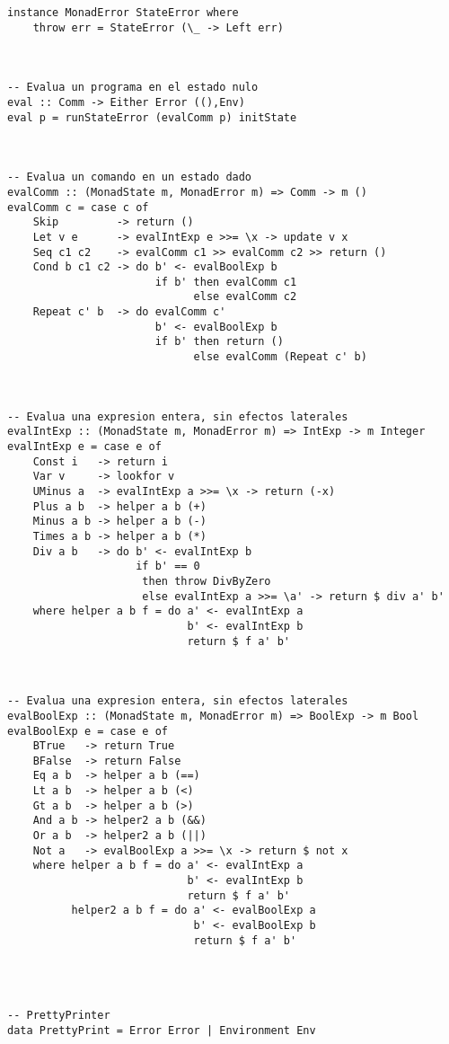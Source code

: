 \documentclass[a4paper]{report}
\begin{document}
\begin{lstlisting}
instance MonadError StateError where
    throw err = StateError (\_ -> Left err)



-- Evalua un programa en el estado nulo
eval :: Comm -> Either Error ((),Env)
eval p = runStateError (evalComm p) initState



-- Evalua un comando en un estado dado
evalComm :: (MonadState m, MonadError m) => Comm -> m ()
evalComm c = case c of
    Skip         -> return ()
    Let v e      -> evalIntExp e >>= \x -> update v x
    Seq c1 c2    -> evalComm c1 >> evalComm c2 >> return ()
    Cond b c1 c2 -> do b' <- evalBoolExp b
                       if b' then evalComm c1
                             else evalComm c2
    Repeat c' b  -> do evalComm c'
                       b' <- evalBoolExp b
                       if b' then return ()
                             else evalComm (Repeat c' b)



-- Evalua una expresion entera, sin efectos laterales
evalIntExp :: (MonadState m, MonadError m) => IntExp -> m Integer
evalIntExp e = case e of
    Const i   -> return i
    Var v     -> lookfor v
    UMinus a  -> evalIntExp a >>= \x -> return (-x)
    Plus a b  -> helper a b (+)
    Minus a b -> helper a b (-)
    Times a b -> helper a b (*)
    Div a b   -> do b' <- evalIntExp b
                    if b' == 0
                     then throw DivByZero
                     else evalIntExp a >>= \a' -> return $ div a' b'
    where helper a b f = do a' <- evalIntExp a
                            b' <- evalIntExp b
                            return $ f a' b'



-- Evalua una expresion entera, sin efectos laterales
evalBoolExp :: (MonadState m, MonadError m) => BoolExp -> m Bool
evalBoolExp e = case e of
    BTrue   -> return True
    BFalse  -> return False
    Eq a b  -> helper a b (==)
    Lt a b  -> helper a b (<)
    Gt a b  -> helper a b (>)
    And a b -> helper2 a b (&&)
    Or a b  -> helper2 a b (||)
    Not a   -> evalBoolExp a >>= \x -> return $ not x
    where helper a b f = do a' <- evalIntExp a
                            b' <- evalIntExp b
                            return $ f a' b'
          helper2 a b f = do a' <- evalBoolExp a
                             b' <- evalBoolExp b
                             return $ f a' b'




-- PrettyPrinter
data PrettyPrint = Error Error | Environment Env


\end{lstlisting}
\end{document}
